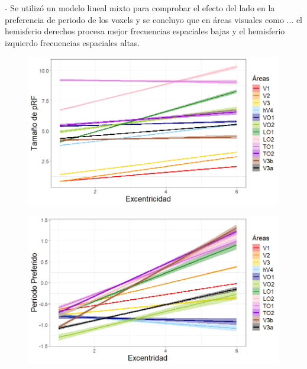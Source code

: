 - Se utiliz\'o un modelo lineal mixto para comprobar el efecto del lado en la preferencia de periodo de los voxels y se concluyo que en \'areas visuales como ... el hemisferio derechos procesa mejor frecuencias espaciales bajas y el hemisferio izquierdo frecuencias espaciales altas.


\begin{figure}
	\centering		
	\includegraphics[scale=0.8]{../images/sigma_vs_eccen_all_rois}
	\label{fig:sigma_vs_eccen}
\end{figure}

\begin{figure}
	\centering		
	\includegraphics[scale=0.8]{images/pp_vs_eccen_all_rois}
	\label{fig:pp_vs_eccen}
\end{figure}

